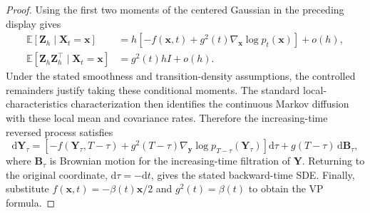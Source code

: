 \documentclass[11pt,a4paper]{article}
\theoremstyle{definition}
\begin{document}
\begin{proof}
Using the first two moments of the centered Gaussian in the preceding display gives
\[
\begin{aligned}
\mathbb{E}\!\left[
\mathbf{Z}_h\mid\mathbf{X}_t=\mathbf{x}
\right]
&=
h\left[
-f(\mathbf{x},t)
+g^2(t)\nabla_{\mathbf{x}}\log p_t(\mathbf{x})
\right]+o(h),\\
\mathbb{E}\!\left[
\mathbf{Z}_h\mathbf{Z}_h^\top
\mid\mathbf{X}_t=\mathbf{x}
\right]
&=
g^2(t)hI+o(h).
\end{aligned}
\]
Under the stated smoothness and transition-density assumptions, the controlled remainders
justify taking these conditional moments. The standard local-characteristics
characterization then identifies the continuous Markov diffusion with these local mean and
covariance rates. Therefore the increasing-time reversed process satisfies
\[
\mathrm{d}\mathbf{Y}_\tau
=\left[
-f(\mathbf{Y}_\tau,T-\tau)
+g^2(T-\tau)
\nabla_{\mathbf{y}}\log p_{T-\tau}(\mathbf{Y}_\tau)
\right]\mathrm{d}\tau
+g(T-\tau)\,\mathrm{d}\mathbf{B}_\tau,
\]
where $\mathbf{B}_\tau$ is Brownian motion for the increasing-time filtration of
$\mathbf{Y}$. Returning to the original coordinate, $\mathrm{d}\tau=-\mathrm{d}t$, gives
the stated backward-time SDE. Finally, substitute
$f(\mathbf{x},t)=-\beta(t)\mathbf{x}/2$ and $g^2(t)=\beta(t)$ to obtain the VP formula.
\end{proof}
\end{document}
